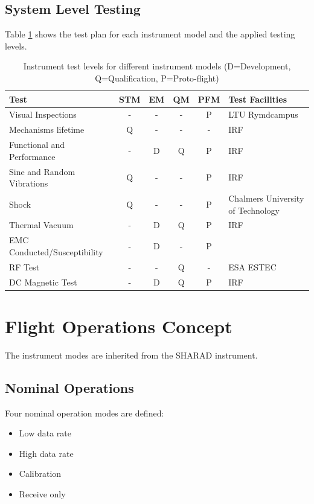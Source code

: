\subsection{System Level Testing}
%
%
Table \ref{tab:instrument_testing} shows the test plan for each instrument model and the applied testing levels.
%
\begin{table}[H]
\centering
\caption{Instrument test levels for different instrument models (D=Development, Q=Qualification, P=Proto-flight)}
\label{tab:instrument_testing}
\begin{tabular}{p{}ccccp{}}
\hline
\textbf{Test} & \textbf{STM} & \textbf{EM} & \textbf{QM}& \textbf{PFM} & \textbf{Test Facilities}\\
\hline
Visual Inspections & - & - & - & P & LTU Rymdcampus\\
Mechanisms lifetime & Q & - & - & - & \ac{IRF}\\
Functional and Performance & - & D & Q & P & \ac{IRF}\\
Sine and Random Vibrations & Q & - & - & P & \ac{IRF}\\
Shock & Q & - & - & P &Chalmers University of Technology\cite{Jonsson}\\
Thermal Vacuum & - & D & Q & P & \ac{IRF}\\
EMC Conducted/Susceptibility & - & D & - & P &\\
RF Test & - & - & Q & - & ESA ESTEC\\
DC Magnetic Test & - & D & Q & P & \ac{IRF}\\
\hline
\end{tabular}
\end{table}
%
%
%
\section{Flight Operations Concept}
%
The instrument modes are inherited from the SHARAD instrument\cite{SHARAD_ppt}.
%
\subsection{Nominal Operations}
%
Four nominal operation modes are defined:
\begin{itemize}
\item Low data rate
\item High data rate
\item Calibration
\item Receive only
\end{itemize}
%
